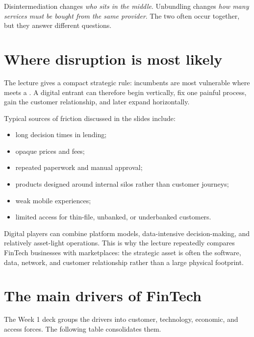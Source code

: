 \begin{keyidea}
Disintermediation changes \emph{who sits in the middle}. Unbundling changes \emph{how many services must be bought from the same provider}. The two often occur together, but they answer different questions.
\end{keyidea}

\section{Where disruption is most likely}

The lecture gives a compact strategic rule: incumbents are most vulnerable where  meets a . A digital entrant can therefore begin vertically, fix one painful process, gain the customer relationship, and later expand horizontally.

Typical sources of friction discussed in the slides include:

\begin{itemize}
  \item long decision times in lending;
  \item opaque prices and fees;
  \item repeated paperwork and manual approval;
  \item products designed around internal silos rather than customer journeys;
  \item weak mobile experiences;
  \item limited access for thin-file, unbanked, or underbanked customers.
\end{itemize}

Digital players can combine platform models, data-intensive decision-making, and relatively asset-light operations. This is why the lecture repeatedly compares FinTech businesses with marketplaces: the strategic asset is often the software, data, network, and customer relationship rather than a large physical footprint.

\section{The main drivers of FinTech}

The Week 1 deck groups the drivers into customer, technology, economic, and access forces. The following table consolidates them.

